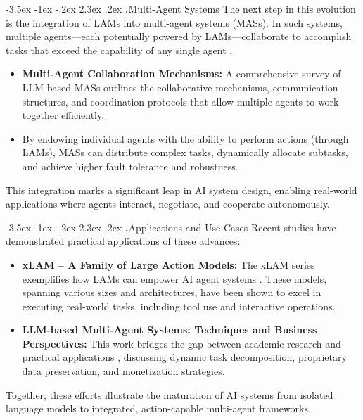 \documentclass[journal,twoside,10pt]{IEEEtran}
\makeatletter
\renewcommand\section{\@startsection{section}{1}{\z@}%
                       {-3.5ex \@plus -1ex \@minus -.2ex}%
                       {2.3ex \@plus.2ex}%
                       {\normalfont\Large\bfseries\Roman{section}.\quad}}
\makeatother
\begin{document}
\section{Multi-Agent Systems}
The next step in this evolution is the integration of LAMs into multi-agent systems (MASs). In such systems, multiple agents—each potentially powered by LAMs—collaborate to accomplish tasks that exceed the capability of any single agent \cite{mas_survey2023}.

\begin{itemize}
    \item \textbf{Multi-Agent Collaboration Mechanisms:} A comprehensive survey of LLM-based MASs outlines the collaborative mechanisms, communication structures, and coordination protocols that allow multiple agents to work together efficiently.
    \item By endowing individual agents with the ability to perform actions (through LAMs), MASs can distribute complex tasks, dynamically allocate subtasks, and achieve higher fault tolerance and robustness.
\end{itemize}

This integration marks a significant leap in AI system design, enabling real-world applications where agents interact, negotiate, and cooperate autonomously.

\section{Applications and Use Cases}
Recent studies have demonstrated practical applications of these advances:

\begin{itemize}
    \item \textbf{xLAM – A Family of Large Action Models:} The xLAM series exemplifies how LAMs can empower AI agent systems \cite{xlam2024}. These models, spanning various sizes and architectures, have been shown to excel in executing real-world tasks, including tool use and interactive operations.
    \item \textbf{LLM-based Multi-Agent Systems: Techniques and Business Perspectives:} This work bridges the gap between academic research and practical applications \cite{mas_business2023}, discussing dynamic task decomposition, proprietary data preservation, and monetization strategies.
\end{itemize}

Together, these efforts illustrate the maturation of AI systems from isolated language models to integrated, action-capable multi-agent frameworks.
\end{document}
